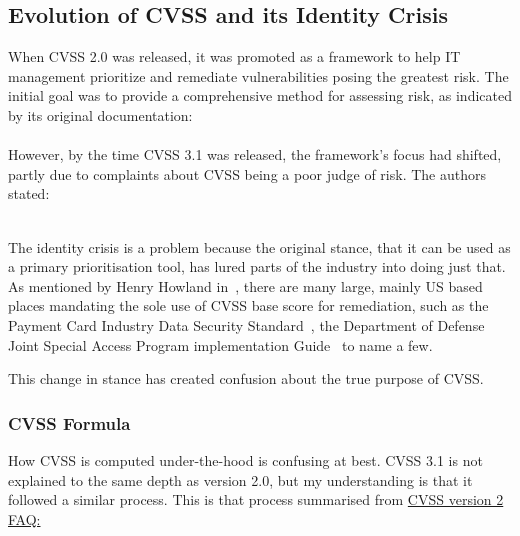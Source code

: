 \documentclass[12pt]{article}
\begin{document}
\subsection{Evolution of CVSS and its Identity Crisis}
When CVSS 2.0 was released, it was promoted as a framework to help IT management prioritize and
remediate vulnerabilities posing the greatest risk. The initial goal was to provide a comprehensive
method for assessing risk, as indicated by its original documentation:
\\

\textit{}~\cite{CVSS_2}
\\

However, by the time CVSS 3.1 was released, the framework's focus had shifted, partly due to
complaints about CVSS being a poor judge of risk. The authors stated:

\textit{}~\cite{CVSS_31}
\\

The identity crisis is a problem because the original stance, that it can be used as a primary
prioritisation tool, has lured parts of the industry into doing just that. As mentioned by Henry
Howland in~\cite{ubiquitous}, there are many large, mainly US based places mandating the sole use of
CVSS base score for remediation, such as the Payment Card Industry Data Security Standard~\cite{PCI}, the
Department of Defense Joint Special Access Program implementation Guide~\cite{DOD} to name a few.

This change in stance has created confusion about the true purpose of CVSS.

\subsubsection{CVSS Formula}


How CVSS is computed under-the-hood is confusing at best. CVSS 3.1 is not explained to the same
depth as version 2.0, but my understanding is that it followed a similar process. This is that
process summarised from
\href{https://www.first.org/cvss/v2/faq#Explanation-of-CVSS-v2-formula-and-metric-valued-development}{CVSS
	version 2 FAQ:}~\cite{CVSS_formula}
\end{document}
